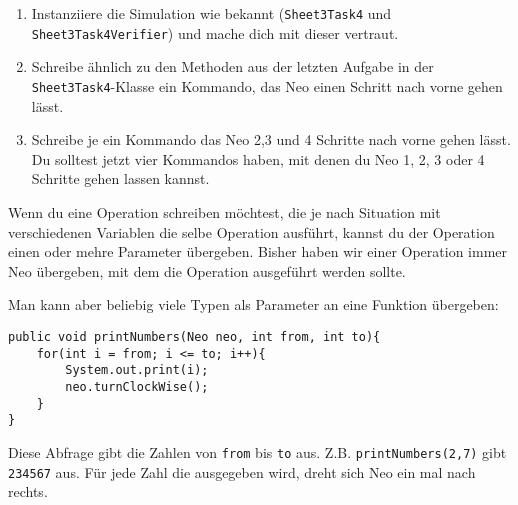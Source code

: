 
\begin{enumerate}
	\item
	Instanziiere die Simulation wie bekannt (\lstinline{Sheet3Task4} und \lstinline{Sheet3Task4Verifier}) und mache dich mit dieser vertraut.
	\item
		Schreibe ähnlich zu den Methoden aus der letzten Aufgabe in der \lstinline{Sheet3Task4}-Klasse ein Kommando, das Neo einen Schritt nach vorne gehen lässt.
	\item
		Schreibe je ein Kommando das Neo 2,3 und 4 Schritte nach vorne gehen lässt.
		Du solltest jetzt vier Kommandos haben, mit denen du Neo 1, 2, 3 oder 4 Schritte gehen lassen kannst.
\end{enumerate}

\begin{Infobox}[Operationsparameter]
	Wenn du eine Operation schreiben möchtest, die je nach Situation mit verschiedenen Variablen die selbe Operation ausführt, kannst du der Operation einen oder mehre Parameter übergeben.
	Bisher haben wir einer Operation immer Neo übergeben, mit dem die Operation ausgeführt werden sollte.\newline

	Man kann aber beliebig viele Typen als Parameter an eine Funktion übergeben:

	\begin{lstlisting}[xleftmargin=0.5cm]
public void printNumbers(Neo neo, int from, int to){
    for(int i = from; i <= to; i++){
		System.out.print(i);
		neo.turnClockWise();
    }
}
	\end{lstlisting}

	Diese Abfrage gibt die Zahlen von \lstinline{from} bis \lstinline{to} aus.
	Z.B. \lstinline{printNumbers(2,7)} gibt \lstinline{234567} aus.
	Für jede Zahl die ausgegeben wird, dreht sich Neo ein mal nach rechts.
\end {Infobox}


